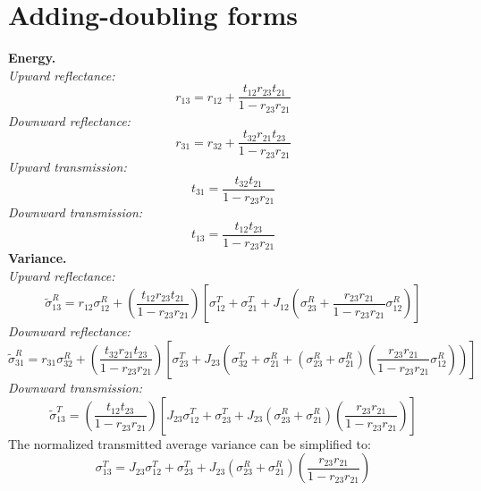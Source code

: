 \section{Adding-doubling forms}
\label{sec:appendix_a}

\textbf{Energy.}\\
\textit{Upward reflectance:}
\begin{equation}
    r_{13} = r_{12} + \frac{t_{12} r_{23} t_{21}}{1 - r_{23} r_{21}}
\end{equation}
\textit{Downward reflectance:}
\begin{equation}
    r_{31} = r_{32} + \frac{t_{32} r_{21} t_{23}}{1 - r_{23} r_{21}}
\end{equation}
\textit{Upward transmission:}
\begin{equation}
    t_{31} = \frac{t_{32} t_{21}}{1 - r_{23} r_{21}}
\end{equation}
\textit{Downward transmission:}
\begin{equation}
    t_{13} = \frac{t_{12} t_{23}}{1 - r_{23} r_{21}}
\end{equation}
\textbf{Variance.}\\
\textit{Upward reflectance:}
\begin{equation}
    \tilde{\sigma}_{13}^R = r_{12} \sigma_{12}^R + \left(\frac{t_{12} r_{23} t_{21}}{1 - r_{23} r_{21}}\right) \left[\sigma_{12}^T + \sigma_{21}^T + J_{12} \left(\sigma_{23}^R + \frac{r_{23} r_{21}}{1 - r_{23} r_{21}}\sigma_{12}^R\right)\right]
\end{equation}
\textit{Downward reflectance:}
\begin{equation}
    \tilde{\sigma}_{31}^R = r_{31} \sigma_{32}^R + \left(\frac{t_{32} r_{21} t_{23}}{1 - r_{23} r_{21}}\right) \left[\sigma_{23}^T + J_{23} \left(\sigma_{32}^T + \sigma_{21}^R + \left(\sigma_{23}^R + \sigma_{21}^R\right) \left(\frac{r_{23} r_{21}}{1 - r_{23} r_{21}}\sigma_{12}^R\right)\right)\right]
\end{equation}
\textit{Downward transmission:}
\begin{equation}
    \tilde{\sigma}_{13}^T = \left(\frac{t_{12} t_{23}}{1 - r_{23} r_{21}}\right) \left[J_{23} \sigma_{12}^T + \sigma_{23}^T + J_{23} \left(\sigma_{23}^R + \sigma_{21}^R\right) \left(\frac{r_{23} r_{21}}{1 - r_{23} r_{21}}\right)\right]
\end{equation}
The normalized transmitted average variance can be simplified to:
\begin{equation}
    \sigma_{13}^T = J_{23} \sigma_{12}^T + \sigma_{23}^T + J_{23} \left(\sigma_{23}^R + \sigma_{21}^R\right) \left(\frac{r_{23} r_{21}}{1 - r_{23} r_{21}}\right)
\end{equation}
